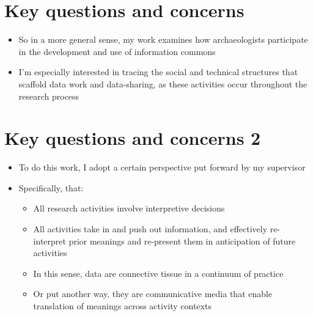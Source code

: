 \documentclass{article}
\begin{document}
\section{Key questions and concerns}
\begin{itemize}
  \item So in a more general sense, my work examines how archaeologists participate in the development and use of information commons
  \item I'm especially interested in tracing the social and technical structures that scaffold data work and data-sharing, as these activities occur throughout the research process
\end{itemize}

\section{Key questions and concerns 2}

\begin{itemize}
  \item To do this work, I adopt a certain perspective put forward by my supervisor
  \item Specifically, that:
  \begin{itemize}
  \item All research activities involve interpretive decisions
  \item All activities take in and push out information, and effectively re-interpret prior meanings and re-present them in anticipation of future activities
  \item In this sense, data are connective tissue in a continuum of practice
  \item Or put another way, they are communicative media that enable translation of meanings across activity contexts
  \end{itemize}

\end{itemize}
\end{document}
